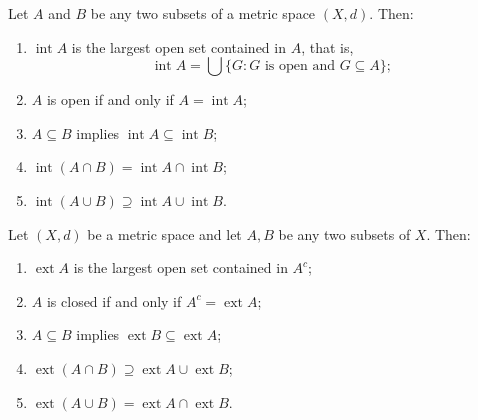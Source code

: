 \documentclass[12pt, a4paper]{article}
\begin{document}
\begin{theorem}
Let $A$ and $B$ be any two subsets of a metric space $(X,d)$. Then:
\begin{enumerate}
    \item $\operatorname{int}A$ is the largest open set contained in $A$, that is,
    \[
    \operatorname{int}A=\bigcup\{G : G \text{ is open and } G\subseteq A\};
    \]
    
    \item $A$ is open if and only if $A=\operatorname{int}A$;
    
    \item $A\subseteq B$ implies $\operatorname{int}A\subseteq \operatorname{int}B$;
    
    \item $\operatorname{int}(A\cap B)=\operatorname{int}A\cap \operatorname{int}B$;
    
    \item $\operatorname{int}(A\cup B)\supseteq \operatorname{int}A\cup \operatorname{int}B$.
\end{enumerate}
\end{theorem}


\clearpage

\begin{theorem}
Let $(X,d)$ be a metric space and let $A,B$ be any two subsets of $X$. Then:
\begin{enumerate}
    \item $\operatorname{ext}A$ is the largest open set contained in $A^c$;
    \item $A$ is closed if and only if $A^c=\operatorname{ext}A$;
    \item $A\subseteq B$ implies $\operatorname{ext}B\subseteq \operatorname{ext}A$;
    \item $\operatorname{ext}(A\cap B)\supseteq \operatorname{ext}A\cup \operatorname{ext}B$;
    \item $\operatorname{ext}(A\cup B)=\operatorname{ext}A\cap \operatorname{ext}B$.
\end{enumerate}
\end{theorem}

\clearpage
\end{document}

